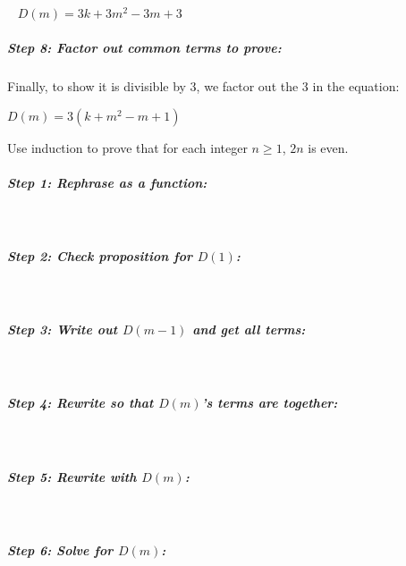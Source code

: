 \documentclass[a4paper,12pt]{book}
\newcounter{question}
\begin{document}
\begin{intro}{\ }
                $D(m) = 3k + 3m^{2} - 3m + 3$

            \subparagraph{Step 8: Factor out common terms to prove:}
                Finally, to show it is divisible by 3, we factor out
                the 3 in the equation:

                $D(m) = 3(k + m^{2} - m + 1)$
        \end{intro}

        \newpage
        
        \begin{questionNOGRADE}{\thequestion}
            Use induction to prove that for each integer $n \geq 1$, $2n$ is even.

            \subparagraph{Step 1: Rephrase as a function:} ~\\
            
            \subparagraph{Step 2: Check proposition for $D(1)$:} ~\\

            \subparagraph{Step 3: Write out $D(m-1)$ and get all terms:} ~\\            

            \subparagraph{Step 4: Rewrite so that $D(m)$'s terms are together:} ~\\

            \subparagraph{Step 5: Rewrite with $D(m)$:}~\\

            \subparagraph{Step 6: Solve for $D(m)$:}~\\


\end{questionNOGRADE}
\end{document}
